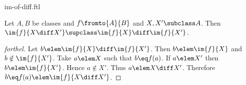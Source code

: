 \documentclass{stex}
\begin{document}
\begin{smodule}{im-of-diff.ftl}


\begin{proposition}[forthel,id=ImOfDifferenceProp]
  Let $A, B$ be classes and $f \fromto{A}{B}$ and $X, X' \subclass A$.
  Then $\im{f}{X \diff X'} \supclass \im{f}{X} \diff \im{f}{X'}$.
\end{proposition}
\begin{proof}[forthel]
  Let $b \elem \im{f}{X} \diff \im{f}{X'}$.
  Then $b \elem \im{f}{X}$ and $b \notin \im{f}{X'}$.
  Take $a \elem X$ such that $b \eq f(a)$.
  If $a \elem X'$ then $b \elem \im{f}{X'}$.
  Hence $a \notin X'$.
  Thus $a \elem X \diff X'$.
  Therefore $b \eq f(a) \elem \im{f}{X \diff X'}$.
\end{proof}

\end{smodule}
\end{document}
